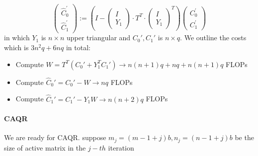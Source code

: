 \documentclass{article}
\begin{document}
\begin{equation}\left(\begin{array}{l}
\hat{C}_{0}^{\prime} \\
\hat{C}_{1}^{\prime}
\end{array}\right):=\left(I-\left(\begin{array}{c}
I \\
Y_{1}
\end{array}\right) \cdot {T^{T}} \cdot\left(\begin{array}{c}
I \\
Y_{1}
\end{array}\right)^{T}\right)\left(\begin{array}{c}
C_{0}^{\prime} \\
C_{1}^{\prime}
\end{array}\right)\end{equation}
in which $Y_1$ is $n\times n$ upper triangular and $C_0', C_1'$ is $n\times q$. We outline the costs which is $3n^2q+6nq$ in total:

\begin{itemize}
	\item Compute $W = T^T(C_0' + Y_1^TC_1') \to n(n+1)q + nq + n(n+1)q$ FLOPs
	\item Compute $\hat C_0' = C_0' - W \to nq$ FLOPs
	\item Compute $\hat C_1' =C_1' - Y_1W \to n(n+2)q$ FLOPs 
\end{itemize}

\paragraph{CAQR} We are ready for CAQR.  suppose $m_j = (m-1+j)b, n_j = (n-1+j)b$ be the size of active matrix in the $j-th$ iteration 
\end{document}
